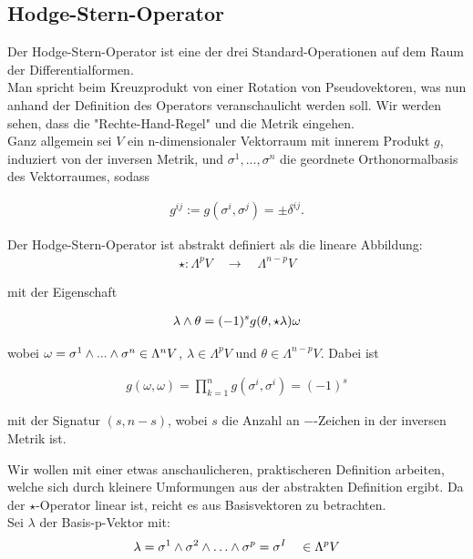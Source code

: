 \subsection{Hodge-Stern-Operator}
Der Hodge-Stern-Operator ist eine der drei Standard-Operationen auf dem Raum der Differentialformen. \\
Man spricht beim Kreuzprodukt von einer Rotation von Pseudovektoren, was nun anhand der Definition des Operators veranschaulicht werden soll. Wir werden sehen, dass die "Rechte-Hand-Regel" und die Metrik eingehen. \\
Ganz allgemein sei $V$ ein n-dimensionaler Vektorraum mit innerem Produkt $g$, induziert von der inversen Metrik, und ${\sigma^1, ..., \sigma^n}$ die geordnete Orthonormalbasis des Vektorraumes, sodass

\begin{align*}
g^{i j} := g(\sigma^{i},\sigma^{j}) = \pm \delta^{i j}.
\end{align*}


Der Hodge-Stern-Operator ist abstrakt definiert als die lineare Abbildung:
\begin{align*}
\star : \Lambda^p V \quad \rightarrow \quad  \Lambda^{n-p} V 
\end{align*}

mit der Eigenschaft

\begin{align}
\lambda \wedge \theta = (-1)^s g(\theta,\star\lambda) \omega
\end{align}

wobei $\omega = \sigma^1 \wedge ... \wedge \sigma^n \in \Lambda^n V$, $\lambda \in \Lambda^p V$ und $\theta \in \Lambda^{n-p} V$. Dabei ist

 \begin{align}
 g(\omega,\omega) = \prod_{k=1}^{n} g(\sigma^{i},\sigma^{i}) = (-1)^s
 \end{align}
 
mit der Signatur $(s,n-s)$, wobei $s$ die Anzahl an $-$-Zeichen in der inversen Metrik ist.

 
Wir wollen mit einer etwas anschaulicheren, praktischeren Definition arbeiten, welche sich durch kleinere Umformungen aus der abstrakten Definition ergibt. Da der $\star$-Operator linear ist, reicht es aus Basisvektoren zu betrachten. \\

 Sei $\lambda$ der Basis-p-Vektor mit:
 \begin{align}
 \lambda = \sigma^1 \w \sigma^2 \w \dots \w \sigma^p = \sigma^{I} \quad \in \Lambda^p V
 \end{align}
 

